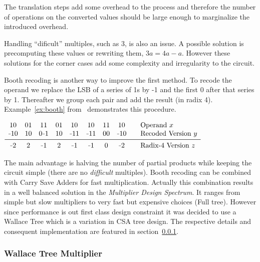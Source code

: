 The translation steps add some overhead to the process and therefore the number of operations on the converted values should be large enough to marginalize the introduced overhead.

Handling ``dificult'' multiples, such as 3, is also an issue. A possible solution is precomputing these values or rewriting them, \eg $3a = 4a - a$. However these solutions for the corner cases add some complexity and irregularity to the circuit.

Booth recoding is another way to improve the first method. To recode the operand we replace the LSB of a series of 1s by -1 and the first 0 after that series by 1. Thereafter we group each pair and add the result (in radix 4). Example~\ref{ex:booth} from~\cite{book} demonstrates this procedure.

\begin{center}
\captionsetup{type=table}
$\begin{array}{ccccccccl}
10  & 01 & 11  & 01 & 10 & 10 & 11 & 10 & \quad\text{Operand } x\\
\unaryminus10 & 10 & 0\unaryminus1 & 10 & \unaryminus11 & \unaryminus11 & 00 & \unaryminus10 &\quad \text{Recoded Version } y\\
\midrule
\unaryminus2 & 2 & \unaryminus1 & 2 & \unaryminus1 & \unaryminus1 & 0 & \unaryminus2 & \quad\text{Radix-4 Version } z\\ 
\end{array}$
\label{ex:booth}
\end{center}

The main advantage is halving the number of partial products while keeping the circuit simple (there are no \emph{difficult} multiples).
Booth recoding can be combined with Carry Save Adders for fast multiplication. Actually this combination results in a well balanced solution in the \emph{Multiplier Design Spectrum}. It ranges from simple but slow multipliers to very fast but expensive choices (\ie Full tree).
However since performance is out first class design constraint it was decided to use a Wallace Tree which is a variation in CSA tree design. The respective details and consequent implementation are featured in section~\ref{sec:wallace}.

\subsubsection{Wallace Tree Multiplier}
\label{sec:wallace}

